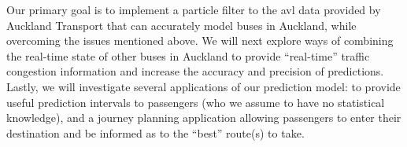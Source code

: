 \documentclass[12pt,a4paper]{article}
\newcommand{\pf}{particle filter}
\begin{document}
Our primary goal is to implement a \pf{} to the \gls{avl} data provided by Auckland Transport
that can accurately model buses in Auckland,
while overcoming the issues mentioned above.
We will next explore ways of combining the real-time state of other buses in Auckland
to provide ``real-time'' traffic congestion information 
and increase the accuracy and precision of predictions.
Lastly, we will investigate several applications of our prediction model:
to provide useful prediction intervals to passengers
(who we assume to have no statistical knowledge),
and a journey planning application allowing passengers to enter their destination
and be informed as to the ``best'' route(s) to take.














\end{document}
